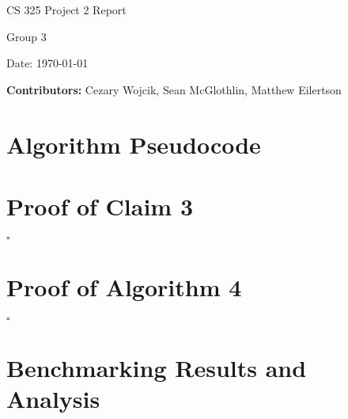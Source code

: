 \documentclass[12pt,letterpaper]{article}
\begin{document}
\begin{titlepage}
    \vspace*{4cm}
    {\huge \center
        CS 325 Project 2 Report\\[1cm]
    }
    \center
    {\large
        Group 3

        Date: \today

    \textbf{Contributors:}
	Cezary Wojcik,
    Sean McGlothlin,
    Matthew Eilertson
	}

\end{titlepage}

\section{Algorithm Pseudocode}

\section{Proof of Claim 3}

$\square$

\section{Proof of Algorithm 4}

$\square$

\section{Benchmarking Results and Analysis}
\end{document}
